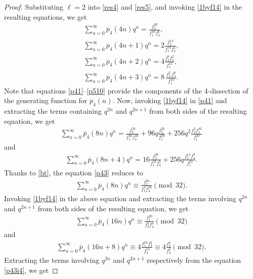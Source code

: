 \documentclass[11pt, reqno]{amsart}
\numberwithin{equation}{section}
\begin{document}
	\begin{proof}
		Substituting $\ell=2$ into \eqref{res4} and \eqref{res5}, and invoking \eqref{1byf14} in the resulting equations, we get
		\begin{align}
			\sum_{n=0}^{\infty}\overline{p}_{4}(4n)q^n=\frac{f_2^{20}}{f_1^{16}f_4^6},\label{p41}\\
			\sum_{n=0}^{\infty}\overline{p}_{4}(4n+1)q^n= 2\frac{f_2^{14}}{f_1^{14}f_4^2},\label{p50}\\
			\sum_{n=0}^{\infty}\overline{p}_{4}(4n+2)q^n=4\frac{f_2^{8}f_4^2}{f_1^{12}},\label{p42}\\
			\sum_{n=0}^{\infty}\overline{p}_{4}(4n+3)q^n=8\,\frac{f_2^2\,f_4^{6}}{f_1^{10}}.\label{p510}
		\end{align}
		Note that equations \eqref{p41}--\eqref{p510} provide the components of the 4-dissection of the generating function for $\overline{p}_{4}(n)$. Now, invoking \eqref{1byf14} in \eqref{p41} and extracting the terms containing $q^{2n}$ and $q^{2n+1}$ from both sides of the resulting equation, we get
		\begin{align}
			\sum_{n=0}^{\infty}\overline{p}_{4}(8n)q^n=\frac{f_2^{50}}{f_1^{36}f_{4}^{16}} +  96q\frac{f_2^{26}}{f_1^{28}}+256q^2\frac{f_2^{2} f_{4}^{16}}{f_1^{20}}\label{p43}
		\end{align}
		and
		\begin{align}
			\sum_{n=0}^{\infty}\overline{p}_{4}(8n+4)q^n=16\frac{f_2^{38}}{f_1^{32} f_{4}^{8}} +  256q\frac{f_2^{14} f_{4}^{8}}{f_1^{24}}.\label{p44}
		\end{align}
		Thanks to \eqref{bt}, the equation \eqref{p43} reduces to
		\begin{align}
			\sum_{n=0}^{\infty}\overline{p}_{4}(8n)q^n\equiv\frac{f_2^{34}}{f_1^{4}f_{4}^{16}}\pmod{32}.\label{p43i1}
		\end{align}
		Invoking \eqref{1byf14} in the above equation and extracting the terms involving $q^{2n}$ and $q^{2n+1}$ from both sides of the resulting equation, we get
		\begin{align}
			\sum_{n=0}^{\infty}\overline{p}_{4}(16n)q^n\equiv\frac{f_1^{20}}{f_2^{2}f_{4}^{4}}\pmod{32}\label{p43i2}
		\end{align}
		and
		\begin{align}
			\sum_{n=0}^{\infty}\overline{p}_{4}(16n+8)q^n\equiv4\frac{f_1^{24}f_{4}^{4}}{f_2^{14}}\equiv4\frac{f_{4}^{4}}{f_2^{2}}\pmod{32}.\label{p43i4}
		\end{align}
		Extracting the terms involving $q^{2n}$ and $q^{2n+1}$ respectively from the equation \eqref{p43i4}, we get

\end{proof}
\end{document}

